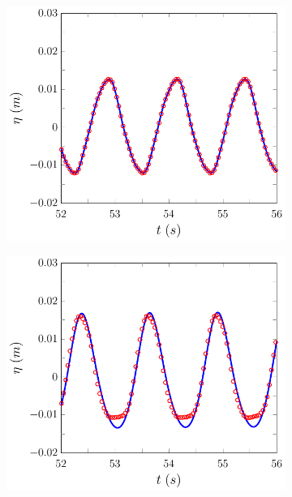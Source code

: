 \begin{figure}
	\centering
	\begin{subfigure}{0.5\textwidth}
		\includegraphics[width=\textwidth]{./chp6/figures/Experiment/Beji/sh/FDVMWG1.pdf}
		\vspace{0.5cm}
	\end{subfigure}%
	\begin{subfigure}{0.5\textwidth}
		\includegraphics[width=\textwidth]{./chp6/figures/Experiment/Beji/sh/FDVMWG2.pdf}

\end{subfigure}
\end{figure}
